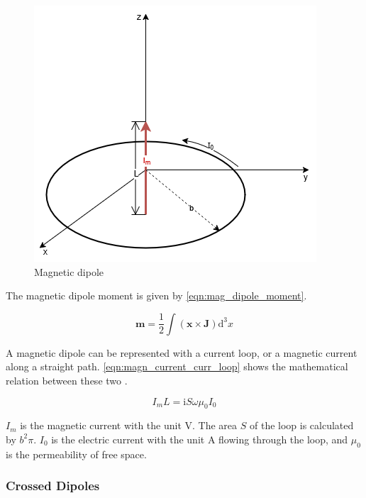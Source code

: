 \begin{figure}[h]
    \centering
    \includegraphics[width=0.5\linewidth]{content//10_theory//img/magnetic_dipole_drawing.png}
    \caption{Magnetic dipole}
    \label{fig:magnetic_dipole_drawing}
\end{figure}

The magnetic dipole moment is given by \autoref{eqn:mag_dipole_moment}.

\begin{equation}
    \mathbf{m}=\frac{1}{2}\int (\mathbf{x} \times \mathbf{J})\mathrm{d}^3x
    \label{eqn:mag_dipole_moment}
\end{equation}

A magnetic dipole can be represented with a current loop, or a magnetic current along a straight path. \autoref{eqn:magn_current_curr_loop} shows the mathematical relation between these two \cite{Balanis_1997}. 

\begin{equation}
    I_m L = \mathrm{i}S\omega\mu_0 I_0
    \label{eqn:magn_current_curr_loop}
\end{equation}

$I_m$ is the magnetic current with the unit $\mathrm{V}$. The area $S$ of the loop is calculated by $b^2\pi$. $I_0$ is the electric current with the unit $\mathrm{A}$ flowing through the loop, and $\mu_0$ is the permeability of free space.


\subsubsection{Crossed Dipoles}


